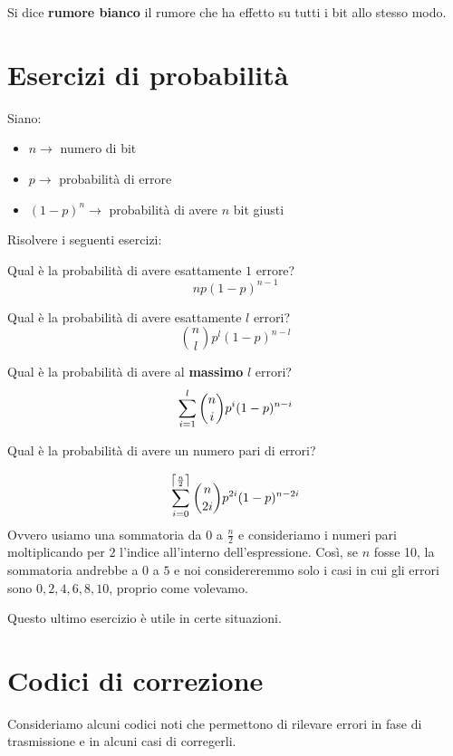 \documentclass[12pt]{report}
\begin{document}
    \begin{defi}
        Si dice \textbf{rumore bianco} il rumore che ha effetto su tutti i bit allo stesso modo.
    \end{defi}

    \section{Esercizi di probabilità}

    Siano:

    \begin{itemize}
        \item $n \rightarrow$ numero di bit
        \item $p \rightarrow$ probabilità di errore
        \item $(1-p)^n \rightarrow$ probabilità di avere $n$ bit giusti
    \end{itemize}
    Risolvere i seguenti esercizi:

    \begin{es}
        Qual è la probabilità di avere esattamente $1$ errore?
        $$np (1-p)^{n-1}$$
    \end{es}

    \begin{es}
        Qual è la probabilità di avere esattamente $l$ errori?
        $$\binom{n}{l}p^l (1-p)^{n-l}$$
    \end{es}

    \begin{es}
        Qual è la probabilità di avere al \textbf{massimo} $l$ errori?
        $$\sum_{i=1}^{l} \binom{n}{i}p^i (1-p)^{n-i}$$
    \end{es}

    \begin{es}
        Qual è la probabilità di avere un numero pari di errori?

        $$\sum_{i = 0}^{\left\lceil \frac{n}{2} \right\rceil} \binom{n}{2i}p^{2i} (1-p)^{n-2i}$$
        Ovvero usiamo una sommatoria da $0$ a $\frac{n}{2}$ e consideriamo i numeri pari moltiplicando per $2$ l'indice all'interno dell'espressione. Così, se $n$ fosse 10, la sommatoria andrebbe a $0$ a $5$ e noi considereremmo solo i casi in cui gli errori sono $0,2,4,6,8,10$, proprio come volevamo.
    \end{es}
    Questo ultimo esercizio è utile in certe situazioni.

    \section{Codici di correzione}
    Consideriamo alcuni codici noti che permettono di rilevare errori in fase di trasmissione e in alcuni casi di corregerli.
\end{document}
